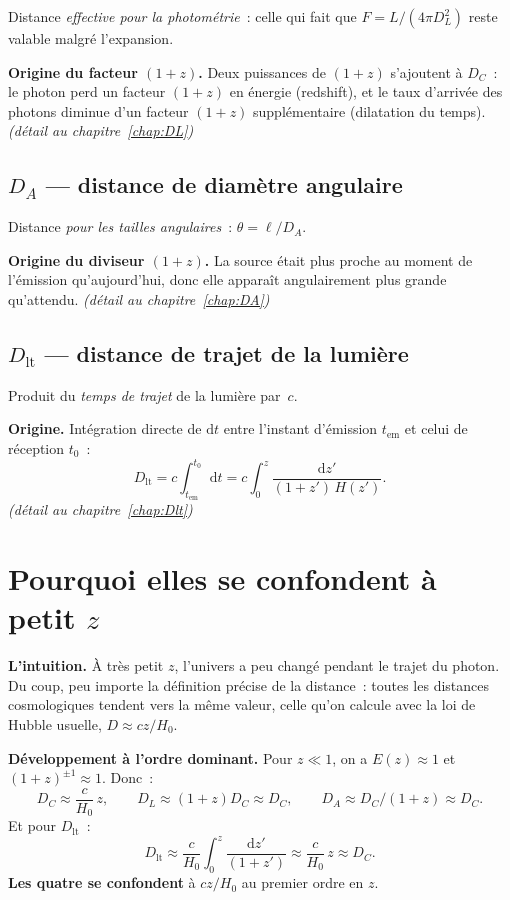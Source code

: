 \documentclass[11pt,a4paper,openany]{report}
\newcommand{\dif}{\mathrm{d}}
\newcommand{\Hzero}{H_{0}}
\begin{document}
Distance \emph{effective pour la photométrie}~: celle qui fait que
$F = L/(4\pi D_{L}^{2})$ reste valable malgré l'expansion.

\textbf{Origine du facteur $(1+z)$.} Deux puissances de $(1+z)$ s'ajoutent à
$D_{C}$~: le photon perd un facteur $(1+z)$ en énergie (redshift), et le taux
d'arrivée des photons diminue d'un facteur $(1+z)$ supplémentaire (dilatation
du temps). \hfill\emph{(détail au chapitre~\ref{chap:DL})}

\subsection*{$D_{A}$ --- distance de diamètre angulaire}

Distance \emph{pour les tailles angulaires}~: $\theta = \ell / D_{A}$.

\textbf{Origine du diviseur $(1+z)$.} La source était plus proche au moment
de l'émission qu'aujourd'hui, donc elle apparaît angulairement plus grande
qu'attendu. \hfill\emph{(détail au chapitre~\ref{chap:DA})}

\subsection*{$D_{\text{lt}}$ --- distance de trajet de la lumière}

Produit du \emph{temps de trajet} de la lumière par~$c$.

\textbf{Origine.} Intégration directe de $\dif t$ entre l'instant d'émission
$t_{\text{em}}$ et celui de réception $t_{0}$~:
\[
D_{\text{lt}} = c\int_{t_{\text{em}}}^{t_{0}}\dif t
              = c\int_{0}^{z}\frac{\dif z'}{(1+z')\,H(z')}.
\]
\hfill\emph{(détail au chapitre~\ref{chap:Dlt})}

\section{Pourquoi elles se confondent à petit $z$}

\begin{tcolorbox}[vulgarisation]
\textbf{L'intuition.} À très petit $z$, l'univers a peu changé pendant le
trajet du photon. Du coup, peu importe la définition précise de la distance~:
toutes les distances cosmologiques tendent vers la même valeur, celle qu'on
calcule avec la loi de Hubble usuelle, $D \approx cz/\Hzero$.
\end{tcolorbox}

\begin{tcolorbox}[mathspe]
\textbf{Développement à l'ordre dominant.} Pour $z \ll 1$, on a $E(z) \approx
1$ et~$(1+z)^{\pm 1} \approx 1$. Donc~:
\[
D_{C} \approx \frac{c}{\Hzero}\,z, \qquad
D_{L} \approx (1+z) D_{C} \approx D_{C}, \qquad
D_{A} \approx D_{C}/(1+z) \approx D_{C}.
\]
Et pour $D_{\text{lt}}$~:
\[
D_{\text{lt}} \approx \frac{c}{\Hzero}\int_{0}^{z}\frac{\dif z'}{(1+z')} \approx
              \frac{c}{\Hzero}\,z \approx D_{C}.
\]
\textbf{Les quatre se confondent} à $cz/\Hzero$ au premier ordre en $z$.
\end{tcolorbox}
\end{document}
